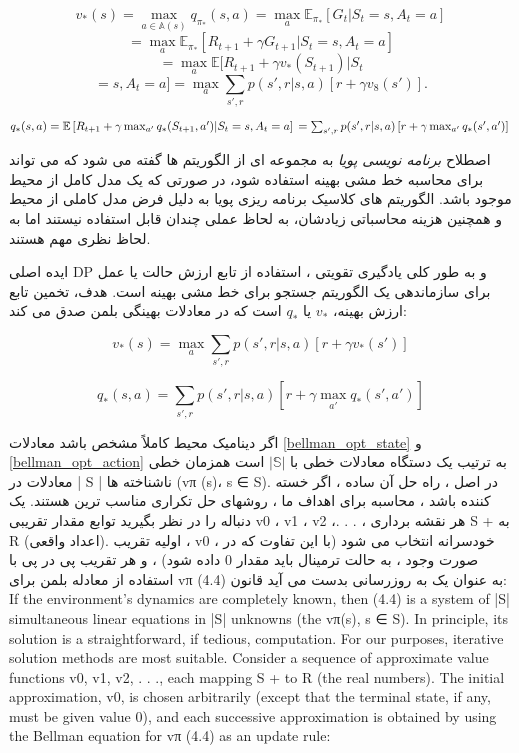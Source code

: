 $$ v_*(s)= \max_{a \in \mathbb{A}(s)} q_{\pi_*}(s,a) = \max_{a} \mathbb{E}_{\pi_*} [G_t|S_t=s, A_t=a] $$
$$ = \max_{a} \mathbb{E}_{\pi_*} [R_{t+1} + \gamma G_{t+1} | S_t=s, A_t=a] $$
$$ = \max_{a} \mathbb{E} [R_{t+1} + \gamma v_*(S_{t+1}) | S_t $$
$$ = s, A_t = a] = \max_{a} \sum_{s',r} p(s',r|s,a) [r + \gamma v_8(s')].$$



$q_*(s,a) = \mathbb{E}\left[R_{t+1} + \gamma \max_{a'} q_*(S_{t+1},a')| S_t=s, A_t=a \right] \\
= \sum_{s',r} p(s',r|s,a) \left[r + \gamma \max_{a'} q_*(s',a')\right] \\
$

اصطلاح \textit{برنامه نویسی پویا}   به مجموعه ای از الگوریتم ها گفته می شود که می تواند برای محاسبه خط مشی بهینه استفاده شود، در صورتی که یک مدل کامل از محیط موجود باشد.
الگوریتم های کلاسیک برنامه ریزی پویا به دلیل فرض
مدل کاملی از محیط و همچنین هزینه محاسباتی زیادشان، به لحاظ عملی چندان قابل استفاده نیستند اما به لحاظ نظری مهم هستند.


ایده اصلی DP و به طور کلی یادگیری تقویتی ، استفاده از تابع ارزش حالت یا عمل برای سازماندهی یک الگوریتم جستجو برای خط مشی بهینه است.
هدف، تخمین تابع ارزش بهینه،
$v_*$
یا
$q_*$
است
که در معادلات بهینگی بلمن صدق می کند:


$$v_*(s)= \max_{a} \sum_{s',r} p(s',r | s,a)[r + \gamma v_*(s')]$$ \label{bellman_opt_state}

$$q_*(s,a) = \sum_{s',r} p(s',r | s,a)[r + \gamma \max_{a'} q_* (s',a')]$$
\label{bellman_opt_action}

اگر دینامیک محیط کاملاً مشخص باشد معادلات 
\ref{bellman_opt_state}
و
\ref{bellman_opt_action}
به ترتیب یک دستگاه معادلات خطی با $|\mathbb{S}|$
  است همزمان خطی
معادلات در | S | ناشناخته ها (vπ (s)، s ∈ S). در اصل ، راه حل آن ساده ، اگر خسته کننده باشد ،
محاسبه برای اهداف ما ، روشهای حل تکراری مناسب ترین هستند. یک دنباله را در نظر بگیرید
توابع مقدار تقریبی v0 ، v1 ، v2 ،. . . ، هر نقشه برداری S
+ به R (اعداد واقعی). اولیه
تقریب ، v0 ، خودسرانه انتخاب می شود (با این تفاوت که در صورت وجود ، به حالت ترمینال باید مقدار 0 داده شود) ،
و هر تقریب پی در پی با استفاده از معادله بلمن برای vπ (4.4) به عنوان یک به روزرسانی بدست می آید
قانون:
If the environment’s dynamics are completely known, then (4.4) is a system of |S| simultaneous linear
equations in |S| unknowns (the vπ(s), s ∈ S). In principle, its solution is a straightforward, if tedious,
computation. For our purposes, iterative solution methods are most suitable. Consider a sequence
of approximate value functions v0, v1, v2, . . ., each mapping S
+ to R (the real numbers). The initial
approximation, v0, is chosen arbitrarily (except that the terminal state, if any, must be given value 0),
and each successive approximation is obtained by using the Bellman equation for vπ (4.4) as an update
rule:


